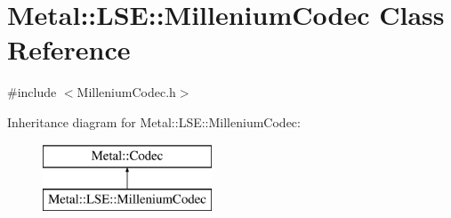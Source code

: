 \hypertarget{classMetal_1_1LSE_1_1MilleniumCodec}{}\section{Metal\+:\+:L\+S\+E\+:\+:Millenium\+Codec Class Reference}
\label{classMetal_1_1LSE_1_1MilleniumCodec}


{\ttfamily \#include $<$Millenium\+Codec.\+h$>$}

Inheritance diagram for Metal\+:\+:L\+S\+E\+:\+:Millenium\+Codec\+:\begin{figure}[H]
\begin{center}
\leavevmode
\includegraphics[height=2.000000cm]{classMetal_1_1LSE_1_1MilleniumCodec}
\end{center}
\end{figure}
